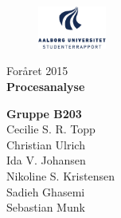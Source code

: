 
\thispagestyle{empty}

\begin{figure}[H]
	\raggedleft
		\includegraphics[width=0.2\textwidth]{figures/aaulogo-da.png}
\end{figure}
\vspace*{\fill} 
\begin{center}	
\begin{Huge}
Foråret 2015\\
\vspace{5 mm}
\textbf{Procesanalyse}\\
\vspace{3 mm}
\end{Huge}
\vspace*{\fill}
\end{center}

\begin{center}
\textbf{Gruppe B203} \\
Cecilie S. R. Topp  \\
Christian Ulrich \\
Ida V. Johansen \\
Nikoline S. Kristensen \\
Sadieh Ghasemi \\
Sebastian Munk \\

\end{center}